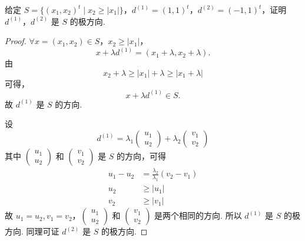 \begin{example}
    给定 $S = \{(x_1, x_2)^t \mid x_2 \ge |x_1|\}$，$d^{(1)} = (1, 1)^t$，$d^{(2)} = (-1, 1)^t$，证明 $d^{(1)}$，$d^{(2)}$ 是 $S$ 的极方向.

    \begin{proof}
        $\forall x = (x_1, x_2) \in S$，$x_2 \ge |x_1|$，
        \[x + \lambda d^{(1)} = (x_1 + \lambda, x_2 + \lambda).\]
        由 
        \[x_2 + \lambda \ge |x_1| + \lambda \ge |x_1 + \lambda|\]
        可得，
        \[x + \lambda d^{(1)} \in S.\]
        故 $d^{(1)}$ 是 $S$ 的方向.

        设
        \[d^{(1)} = \lambda_1\begin{pmatrix}
            u_1\\
            u_2
        \end{pmatrix} + \lambda_2\begin{pmatrix}
            v_1 \\
            v_2
        \end{pmatrix}\]
        其中 $\begin{pmatrix}
            u_1 \\
            u_2
        \end{pmatrix}$ 和 $\begin{pmatrix}
            v_1 \\
            v_2
        \end{pmatrix}$ 是 $S$ 的方向，可得 
        \begin{align*}
            u_1 - u_2 &= \frac{\lambda_2}{\lambda_1}(v_2 - v_1)\\
            u_2 &\ge |u_1|\\
            v_2 &\ge |v_1|
        \end{align*}
        故 $u_1 = u_2, v_1 = v_2$，$\begin{pmatrix}
            u_1 \\
            u_2
        \end{pmatrix}$ 和 $\begin{pmatrix}
            v_1 \\
            v_2
        \end{pmatrix}$ 是两个相同的方向. 所以 $d^{(1)}$ 是 $S$ 的极方向. 同理可证 $d^{(2)}$ 是 $S$ 的极方向.
    \end{proof}
\end{example}

